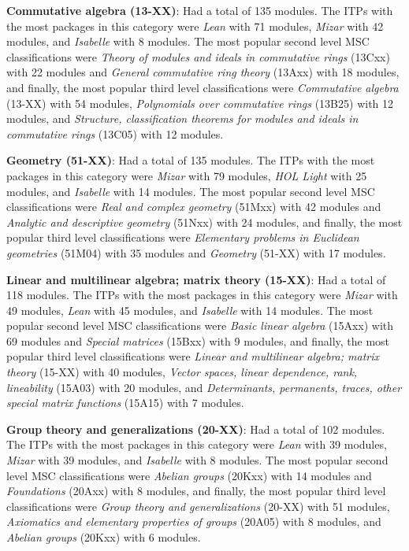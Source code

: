 \documentclass[
]{article}
\begin{document}
\textbf{Commutative algebra (13-XX)}: Had a total of 135 modules. The
ITPs with the most packages in this category were \emph{Lean} with 71
modules, \emph{Mizar} with 42 modules, and \emph{Isabelle} with 8
modules. The most popular second level MSC classifications were
\emph{Theory of modules and ideals in commutative rings} (13Cxx) with 22
modules and \emph{General commutative ring theory} (13Axx) with 18
modules, and finally, the most popular third level classifications were
\emph{Commutative algebra} (13-XX) with 54 modules, \emph{Polynomials
over commutative rings } (13B25) with 12 modules, and \emph{Structure,
classification theorems for modules and ideals in commutative rings}
(13C05) with 12 modules.

\textbf{Geometry (51-XX)}: Had a total of 135 modules. The ITPs with the
most packages in this category were \emph{Mizar} with 79 modules,
\emph{HOL Light} with 25 modules, and \emph{Isabelle} with 14 modules.
The most popular second level MSC classifications were \emph{Real and
complex geometry} (51Mxx) with 42 modules and \emph{Analytic and
descriptive geometry} (51Nxx) with 24 modules, and finally, the most
popular third level classifications were \emph{Elementary problems in
Euclidean geometries} (51M04) with 35 modules and \emph{Geometry }
(51-XX) with 17 modules.

\textbf{Linear and multilinear algebra; matrix theory (15-XX)}: Had a
total of 118 modules. The ITPs with the most packages in this category
were \emph{Mizar} with 49 modules, \emph{Lean} with 45 modules, and
\emph{Isabelle} with 14 modules. The most popular second level MSC
classifications were \emph{Basic linear algebra} (15Axx) with 69 modules
and \emph{Special matrices} (15Bxx) with 9 modules, and finally, the
most popular third level classifications were \emph{Linear and
multilinear algebra; matrix theory} (15-XX) with 40 modules,
\emph{Vector spaces, linear dependence, rank, lineability} (15A03) with
20 modules, and \emph{Determinants, permanents, traces, other special
matrix functions } (15A15) with 7 modules.

\textbf{Group theory and generalizations (20-XX)}: Had a total of 102
modules. The ITPs with the most packages in this category were
\emph{Lean} with 39 modules, \emph{Mizar} with 39 modules, and
\emph{Isabelle} with 8 modules. The most popular second level MSC
classifications were \emph{Abelian groups} (20Kxx) with 14 modules and
\emph{Foundations} (20Axx) with 8 modules, and finally, the most popular
third level classifications were \emph{Group theory and generalizations}
(20-XX) with 51 modules, \emph{Axiomatics and elementary properties of
groups} (20A05) with 8 modules, and \emph{Abelian groups} (20Kxx) with 6
modules.
\end{document}
